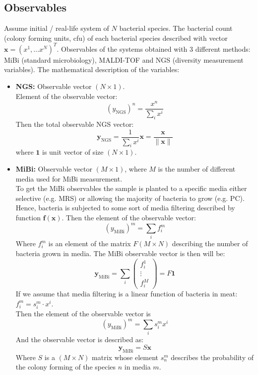 \documentclass[10pt,A4paper]{article}
\begin{document}
\subsection{Observables}
Assume initial / real-life system of $N$ bacterial species.
The bacterial count (colony forming units, cfu) of each bacterial species described with vector $\mathbf{x} = (x^1, ... x^N)^T$.
Observables of the systems obtained with 3 different methods: MiBi (standard microbiology), MALDI-TOF and NGS (diversity measurement variables).
The mathematical description of the variables:
\begin{itemize}
    \item \textbf{NGS:} Observable vector $(N\times1)$.\\
    Element of the observable vector: 
    \begin{equation}
        (y_\text{NGS})^n = \frac{x^n}{\sum_i x^i}
    \end{equation}
    Then the total observable NGS vector: 
    \begin{equation}
        \boxed{\mathbf{y}_\text{NGS} = \frac{1}{\sum_i x^i} \mathbf{x} = \frac{\mathbf{x}}{\lVert \mathbf{x} \rVert}}
    \end{equation}
    where $\mathbf{1}$ is unit vector of size $(N\times1)$.

    \item \textbf{MiBi:} Observable vector $(M\times1)$, where $M$ is the number of different media used for MiBi measurement.\\
    To get the MiBi observables the sample is planted to a specific media either selective (e.g. MRS) or allowing the majority of bacteria to grow (e.g. PC).
    Hence, bacteria is subjected to some sort of media filtering described by function $\mathbf{f}(\mathbf{x})$. 
    Then the element of the observable vector:
    \begin{equation}
        (y_\text{MiBi})^m = \sum_i f^m_i
    \end{equation}
    Where $f^m_i$ is an element of the matrix $F (M \times N)$ describing the number of bacteria grown in media.
    The MiBi observable vector is then will be:
    \begin{equation}
        \mathbf{y}_\text{MiBi} = \sum_i \begin{pmatrix}
            f^1_i \\ \vdots \\ f^M_i
        \end{pmatrix} = F \mathbf{1}
    \end{equation}
    If we assume that media filtering is a linear function of bacteria in meat: $f^m_i=s^m_i \cdot x^i$.\\
    Then the element of the observable vector is
    \begin{equation}
        (y_\text{MiBi})^m = \sum_i s^m_i x^i
    \end{equation}
    And the observable vector is described as:
    \begin{equation}
        \boxed{\mathbf{y}_\text{MiBi} = S \mathbf{x}}
    \end{equation}
    Where $S$ is a $(M \times N)$ matrix whose element $s^m_n$ describes the probability of the colony forming of the species $n$ in media $m$.


\end{itemize}
\end{document}
